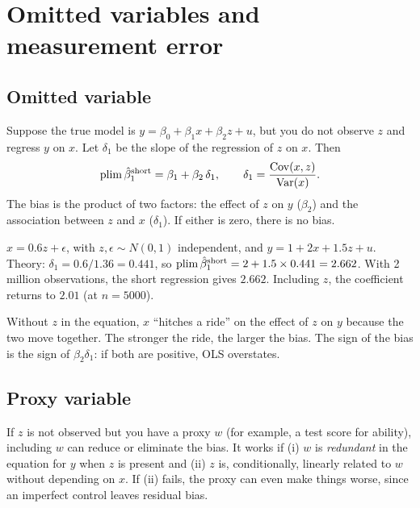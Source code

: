 \chapter{Omitted variables and measurement error}
\label{cap:omit}

\section{Omitted variable}
Suppose the true model is $y=\beta_0+\beta_1x+\beta_2z+u$, but you do not observe $z$ and regress $y$ on $x$. Let $\delta_1$ be the slope of the regression of $z$ on $x$. Then
\[
\operatorname{plim}\hat\beta_1^{\text{short}}=\beta_1+\beta_2\,\delta_1,\qquad \delta_1=\frac{\operatorname{Cov}(x,z)}{\operatorname{Var}(x)}.
\]
The bias is the product of two factors: the effect of $z$ on $y$ ($\beta_2$) and the association between $z$ and $x$ ($\delta_1$). If either is zero, there is no bias.

\begin{simulacao}
$x=0.6z+\epsilon$, with $z,\epsilon\sim N(0,1)$ independent, and $y=1+2x+1.5z+u$. Theory: $\delta_1=0.6/1.36=0.441$, so $\operatorname{plim}\hat\beta_1^{\text{short}}=2+1.5\times0.441=2.662$. With 2 million observations, the short regression gives $2.662$. Including $z$, the coefficient returns to $2.01$ (at $n=5000$).
\end{simulacao}

\begin{intuicao}
Without $z$ in the equation, $x$ ``hitches a ride'' on the effect of $z$ on $y$ because the two move together. The stronger the ride, the larger the bias. The sign of the bias is the sign of $\beta_2\delta_1$: if both are positive, OLS overstates.
\end{intuicao}

\section{Proxy variable}
If $z$ is not observed but you have a proxy $w$ (for example, a test score for ability), including $w$ can reduce or eliminate the bias. It works if (i) $w$ is \emph{redundant} in the equation for $y$ when $z$ is present and (ii) $z$ is, conditionally, linearly related to $w$ without depending on $x$. If (ii) fails, the proxy can even make things worse, since an imperfect control leaves residual bias.

